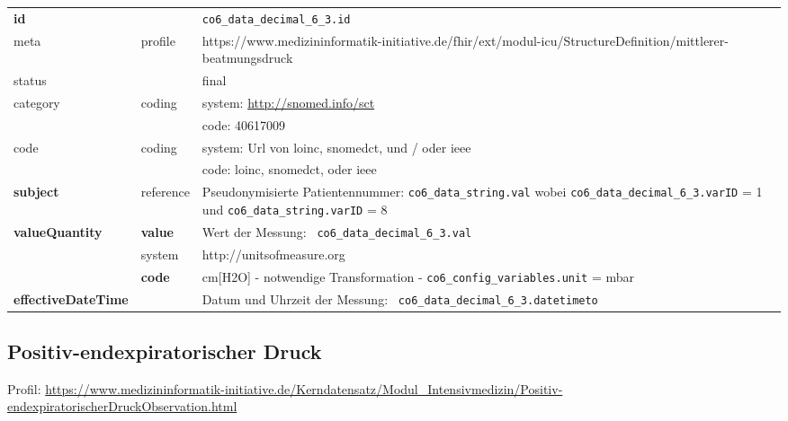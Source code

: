 \begin{longtable}{|l|l|p{7.5cm}|}
	\hline
	\rowcolor{lightgray} \multicolumn{3}{|l|}{Data Mapping (inhaltlich)} \\ \hline
	\textbf{id} &  & \texttt{co6\_data\_decimal\_6\_3.id} \\ \hline
	meta & profile & https://www.medizininformatik-initiative.de/fhir/ext/modul-icu/StructureDefinition/mittlerer-beatmungsdruck \\ \hline 
	status &  & final   \\ \hline 
	category & coding & system: \url{http://snomed.info/sct} \\
	\cline{3-3}
	& & code: 40617009 \\ \hline
	code & coding & system: Url von \ac{loinc}, \ac{snomedct}, und / oder \ac{ieee} \\ 
	\cline{3-3} 
	&  & code: \ac{loinc}, \ac{snomedct}, oder \ac{ieee} \\ \hline
	\textbf{subject} & reference & Pseudonymisierte Patientennummer: \texttt{co6\_data\_string.val} wobei \texttt{co6\_data\_decimal\_6\_3.varID} = 1 und \texttt{co6\_data\_string.varID} = 8 \\ \hline
	\textbf{valueQuantity}  & \textbf{value} & Wert der Messung: \texttt{
		co6\_data\_decimal\_6\_3.val} \\
	\cline{2-3}
	& system & http://unitsofmeasure.org \\
	\cline{2-3}
	& \textbf{code} & cm[H2O] - notwendige Transformation - \texttt{co6\_config\_variables.unit} = mbar \\ \hline
	\textbf{effectiveDateTime}  & & Datum und Uhrzeit der Messung: \texttt{
		co6\_data\_decimal\_6\_3.datetimeto} \\ \hline
\end{longtable}

\subsection{Positiv-endexpiratorischer Druck} 

Profil: \url{https://www.medizininformatik-initiative.de/Kerndatensatz/Modul_Intensivmedizin/Positiv-endexpiratorischerDruckObservation.html}

